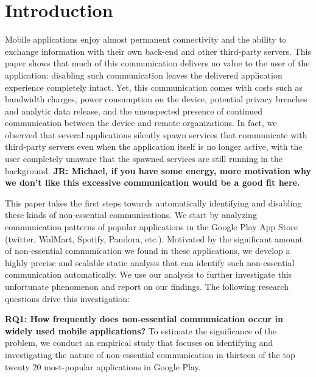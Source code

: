 \section{Introduction}
\label{sec:intro} 

Mobile applications enjoy almost permanent connectivity and the
ability to exchange information with their own back-end and other
third-party servers.  This paper shows that much of this communication
delivers no value to the user of the application: disabling such
communication leaves the delivered application experience completely
intact.  Yet, this communication comes with costs such as bandwidth
charges, power consumption on the device, potential privacy breaches
and analytic data release, and the unsuspected presence of continued
communication between the device and remote organizations. In fact, we
observed that several applications silently spawn services that
communicate with third-party servers even when the application itself
is no longer active, with the user completely unaware that the spawned
services are still running in the background.  {\bf JR: Michael, if
  you have some energy, more motivation why we don't like this
  excessive communication would be a good fit here.}

This paper takes the first steps towards automatically identifying and
disabling these kinds of non-essential communications. We start by
analyzing communication patterns of
popular applications in the Google Play App Store (twitter, WalMart,
Spotify, Pandora, etc.). Motivated by the significant
amount of non-essential communication we found in these applications, 
we develop a highly precise and scalable static analysis that can identify 
such non-essential communication automatically. We use our analysis to further 
investigate this unfortunate phenomenon and report on our findings. 
The following research questions drive this investigation:

\noindent 
{\bf RQ1: How frequently does non-essential communication occur in
  widely used mobile applications?}  To estimate the significance of
the problem, we conduct an empirical study that focuses on identifying
and investigating the nature of non-essential communication in thirteen of the 
top twenty 20 most-popular applications in Google Play.

